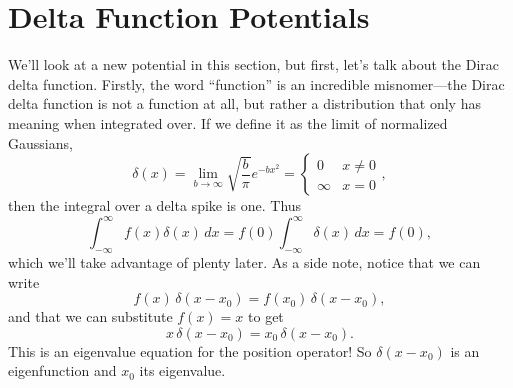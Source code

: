 \documentclass[../p052main.tex]{subfiles}
\begin{document}
\section{Delta Function Potentials}
We'll look at a new potential in this section, but first, let's talk about the Dirac delta function.
Firstly, the word ``function'' is an incredible misnomer---the Dirac delta function is not a function at all, but rather a distribution that only has meaning when integrated over.
If we define it as the limit of normalized Gaussians,
\[ \delta (x) = \lim_{b \to \infty} \sqrt{\frac{b}{\pi}} e^{-bx^2} = \begin{cases} 0 & x \neq 0 \\ \infty & x = 0 \end{cases}, \]
then the integral over a delta spike is one.
Thus %
\[ \int_{-\infty}^{\infty} f(x) \delta(x) \,dx = f(0) \int_{-\infty}^{\infty} \delta(x) \,dx = f(0), \]
which we'll take advantage of plenty later.
As a side note, notice that we can write
\[ f(x) \,\delta (x - x_0) = f(x_0) \,\delta (x - x_0), \]
and that we can substitute $f(x) = x$ to get
\[ x \,\delta (x - x_0) = x_0 \,\delta (x - x_0). \]
This is an eigenvalue equation for the position operator!
So $\delta (x - x_0)$ is an eigenfunction and $x_0$ its eigenvalue.
\end{document}
